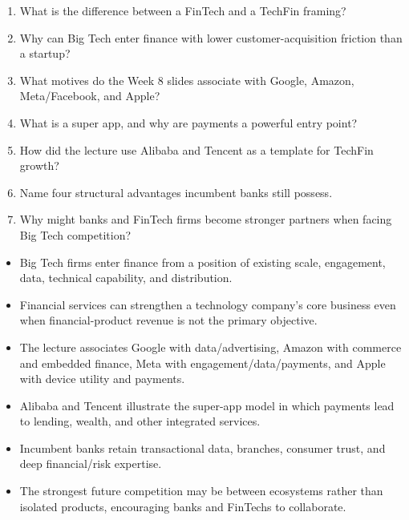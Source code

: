 \begin{quickcheck}
\begin{enumerate}
  \item What is the difference between a FinTech and a TechFin framing?
  \item Why can Big Tech enter finance with lower customer-acquisition friction than a startup?
  \item What motives do the Week 8 slides associate with Google, Amazon, Meta/Facebook, and Apple?
  \item What is a super app, and why are payments a powerful entry point?
  \item How did the lecture use Alibaba and Tencent as a template for TechFin growth?
  \item Name four structural advantages incumbent banks still possess.
  \item Why might banks and FinTech firms become stronger partners when facing Big Tech competition?
\end{enumerate}
\end{quickcheck}

\begin{chapterrecap}
\begin{itemize}
  \item Big Tech firms enter finance from a position of existing scale, engagement, data, technical capability, and distribution.
  \item Financial services can strengthen a technology company's core business even when financial-product revenue is not the primary objective.
  \item The lecture associates Google with data/advertising, Amazon with commerce and embedded finance, Meta with engagement/data/payments, and Apple with device utility and payments.
  \item Alibaba and Tencent illustrate the super-app model in which payments lead to lending, wealth, and other integrated services.
  \item Incumbent banks retain transactional data, branches, consumer trust, and deep financial/risk expertise.
  \item The strongest future competition may be between ecosystems rather than isolated products, encouraging banks and FinTechs to collaborate.
\end{itemize}
\end{chapterrecap}
